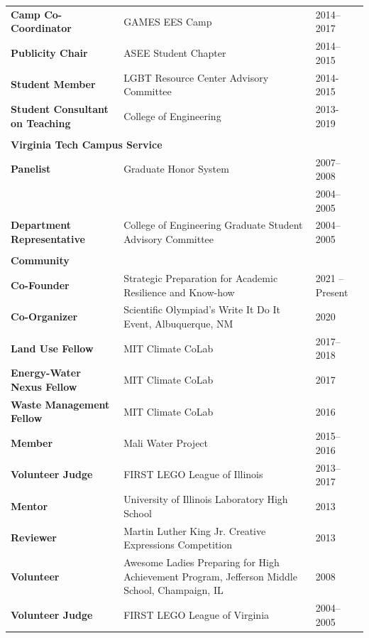 \documentclass{article}[12pt]
\begin{document}
\begin{flushleft}
\begin{tabularx}{\textwidth}{lXl}
			\textbf{Camp Co-Coordinator}& GAMES EES Camp & 2014--2017 \\
			\textbf{Publicity Chair} & ASEE Student Chapter & 2014--2015 \\
			\textbf{Student Member} &  LGBT Resource Center Advisory Committee & 2014-2015 \\
			\textbf{Student Consultant on Teaching} &  College of Engineering & 2013-2019 \\
			\\
			\multicolumn{3}{l}{\large{\textbf{Virginia Tech Campus Service}}}\\
			\textbf{Panelist} & Graduate Honor System & 2007--2008 \\
			& & 2004--2005\\
			\textbf{Department Representative} & College of Engineering Graduate Student Advisory Committee & 2004--2005 \\
			\\
			\multicolumn{3}{l}{\large{\textbf{Community}}}\\
			\textbf{Co-Founder} & Strategic Preparation for Academic Resilience and Know-how & 2021 -- Present \\
			\textbf{Co-Organizer} &  Scientific Olympiad's Write It Do It Event, \newline Albuquerque, NM & 2020 \\
			\textbf{Land Use Fellow} &  MIT Climate CoLab & 2017--2018 \\
			\textbf{Energy-Water Nexus Fellow} & MIT Climate CoLab & 2017 \\
			\textbf{Waste Management Fellow} & MIT Climate CoLab & 2016 \\
			\textbf{Member} & Mali Water Project & 2015--2016 \\
			\textbf{Volunteer Judge} &  FIRST LEGO League of Illinois & 2013--2017 \\
			\textbf{Mentor} & University of Illinois Laboratory High School & 2013 \\
			\textbf{Reviewer} & Martin Luther King Jr. Creative Expressions Competition & 2013 \\
			\textbf{Volunteer} &  Awesome Ladies Preparing for High Achievement Program, Jefferson Middle School, Champaign, IL & 2008 \\
			\textbf{Volunteer Judge} &  FIRST LEGO League of Virginia & 2004--2005
			
		\end{tabularx}
	\end{flushleft}
	
\end{document}
